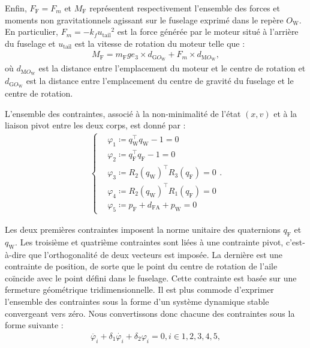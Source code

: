 Enfin, $F_{\text{F}} = F_{m}$ et $M_{\text{F}}$ représentent respectivement l'ensemble des forces et moments non gravitationnels agissant sur le fuselage exprimé dans le repère $O_{\text{W}}$. En particulier, $F_{m} = - k_{f} {u_{\text{tail}}}^{2}$ est la force générée par le moteur situé à l'arrière du fuselage et $u_{\text{tail}}$ est la vitesse de rotation du moteur telle que :
\begin{align}
    M_{\text{F}} =  m_{\text{F}} g e_3 \times d_{\text{G}O_{\text{W}}} + F_{m} \times d_{\text{M}O_{\text{W}}},
\end{align}
où $d_{\text{M}O_{\text{W}}}$ est la distance entre l'emplacement du moteur et le centre de rotation et $d_{\text{G}O_{\text{W}}}$ est la distance entre l'emplacement du centre de gravité du fuselage et le centre de rotation.


L'ensemble des contraintes, associé à la non-minimalité de l'état $(x,v)$ et à la liaison pivot entre les deux corps, est donné par :
\begin{align}
    \label{eq:contraintes}
    \left\{
    \begin{aligned}
    &\varphi_{1} \coloneqq q_{\text{W}}^\top q_{\text{W}} - 1 = 0\\
    &\varphi_{2} \coloneqq q_{\text{F}}^\top q_{\text{F}} - 1 = 0\\
    &\varphi_{3} \coloneqq R_{2}(q_{\text{W}})^\top R_{3}(q_{\text{F}}) = 0\\
    &\varphi_{4} \coloneqq R_{2}(q_{\text{W}})^\top R_{1}(q_{\text{F}}) = 0\\
    &\varphi_{5} \coloneqq p_{\text{F}} + d_{\text{FA}} + p_{\text{W}} = 0
    \end{aligned}.
    \right.
\end{align}

Les deux premières contraintes imposent la norme unitaire des quaternions $q_{\text{F}}$ et $q_{\text{W}}$.
Les troisième et quatrième contraintes sont liées à une contrainte pivot, c'est-à-dire que l'orthogonalité de deux vecteurs est imposée. La dernière est une contrainte de position, de sorte que le point du centre de rotation de l'aile coïncide avec le point défini dans le fuselage. Cette contrainte est basée sur une fermeture géométrique tridimensionnelle.
Il est plus commode d'exprimer l'ensemble des contraintes sous la forme d'un système dynamique stable convergeant vers zéro. Nous convertissons donc chacune des contraintes sous la forme suivante :
\begin{align}
    \ddot{\varphi_{i}} + \delta_{1} \dot{\varphi_{i}}  + \delta_{2} \varphi_{i} = 0, i \in {1,2,3,4,5},
\end{align}

